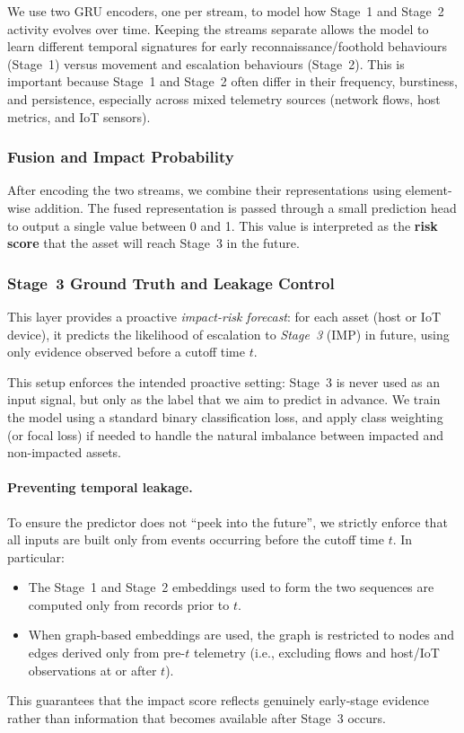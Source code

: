 \documentclass[pdflatex,sn-mathphys-num]{sn-jnl}
\theoremstyle{thmstyleone}%
\theoremstyle{thmstyletwo}%
\theoremstyle{thmstylethree}%
\begin{document}
We use two GRU encoders, one per stream, to model how Stage~1 and Stage~2 activity evolves over time. Keeping the streams separate allows the model to learn different temporal signatures for early reconnaissance/foothold behaviours (Stage~1) versus movement and escalation behaviours (Stage~2). This is important because Stage~1 and Stage~2 often differ in their frequency, burstiness, and persistence, especially across mixed telemetry sources (network flows, host metrics, and IoT sensors).

\subsubsection{Fusion and Impact Probability}
\label{sec:framework_fusion}
After encoding the two streams, we combine their representations using element-wise addition. The fused representation is passed through a small prediction head to output a single value between 0 and 1. This value is interpreted as the \textbf{risk score} that the asset will reach Stage~3 in the future.

\subsubsection{Stage~3 Ground Truth and Leakage Control}
\label{sec:framework_stage3_gt}
This layer provides a proactive \emph{impact-risk forecast}: for each asset (host or IoT device), it predicts the likelihood of escalation to \emph{Stage~3} (IMP) in future, using only evidence observed before a cutoff time $t$.


This setup enforces the intended proactive setting: Stage~3 is never used as an input signal, but only as the label that we aim to predict in advance. We train the model using a standard binary classification loss, and apply class weighting (or focal loss) if needed to handle the natural imbalance between impacted and non-impacted assets.

\paragraph{Preventing temporal leakage.}
To ensure the predictor does not ``peek into the future'', we strictly enforce that all inputs are built only from events occurring before the cutoff time $t$. In particular:
\begin{itemize}
    \item The Stage~1 and Stage~2 embeddings used to form the two sequences are computed only from records prior to $t$.
    \item When graph-based embeddings are used, the graph is restricted to nodes and edges derived only from pre-$t$ telemetry (i.e., excluding flows and host/IoT observations at or after $t$).
\end{itemize}
This guarantees that the impact score reflects genuinely early-stage evidence rather than information that becomes available after Stage~3 occurs.
\end{document}
